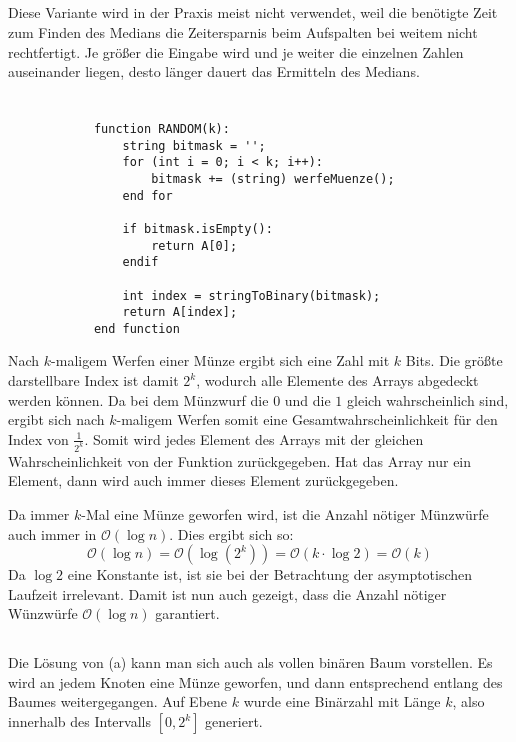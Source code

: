 \documentclass[10pt,a4paper,oneside,ngerman,numbers=noenddot]{scrartcl}
\begin{document}
	\subsection{} %
		Diese Variante wird in der Praxis meist nicht verwendet, weil die benötigte Zeit zum Finden des Medians die Zeitersparnis beim Aufspalten bei weitem nicht rechtfertigt. Je größer die Eingabe wird und je weiter die einzelnen Zahlen auseinander liegen, desto länger dauert das Ermitteln des Medians.
	\subsection{} %
\section{} %
	\subsection{} %
		\begin{verbatim}
			function RANDOM(k):
			    string bitmask = '';
			    for (int i = 0; i < k; i++):
			        bitmask += (string) werfeMuenze();
			    end for
			    
			    if bitmask.isEmpty():
			        return A[0];
			    endif
			    
			    int index = stringToBinary(bitmask);
			    return A[index];
			end function
		\end{verbatim}
		Nach $k$-maligem Werfen einer Münze ergibt sich eine Zahl mit $k$ Bits. Die größte darstellbare Index ist damit $2^{k}$, wodurch alle Elemente des Arrays abgedeckt werden können. Da bei dem Münzwurf die $0$ und die $1$ gleich wahrscheinlich sind, ergibt sich nach $k$-maligem Werfen somit eine Gesamtwahrscheinlichkeit für den Index von $\frac{1}{2^{k}}$. Somit wird jedes Element des Arrays mit der gleichen Wahrscheinlichkeit von der Funktion zurückgegeben. Hat das Array nur ein Element, dann wird auch immer dieses Element zurückgegeben.
		
		Da immer $k$-Mal eine Münze geworfen wird, ist die Anzahl nötiger Münzwürfe auch immer in $\mathcal{O}(\log n)$. Dies ergibt sich so:
		\[
			\mathcal{O}(\log n) = \mathcal{O}(\log(2^{k})) = \mathcal{O}(k \cdot \log 2) = \mathcal{O}(k)
		\]
		Da $\log 2$ eine Konstante ist, ist sie bei der Betrachtung der asymptotischen Laufzeit irrelevant. Damit ist nun auch gezeigt, dass die Anzahl nötiger Wünzwürfe $\mathcal{O}(\log n)$ garantiert.
	\subsection{} %
		Die Lösung von (a) kann man sich auch als vollen binären Baum vorstellen. Es wird an jedem Knoten eine Münze geworfen, und dann entsprechend entlang des Baumes weitergegangen. Auf Ebene $k$ wurde eine Binärzahl mit Länge $k$, also innerhalb des Intervalls $[0, 2^k]$ generiert. 
		
\end{document}
